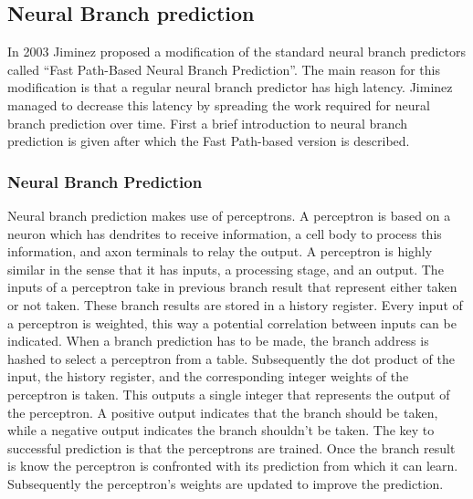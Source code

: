 \subsection{Neural Branch prediction}
\label{sec:neural}
In 2003 Jiminez \cite{neural} proposed a modification of the standard neural branch predictors called \enquote{Fast Path-Based Neural Branch Prediction}.
The main reason for this modification is that a regular neural branch predictor has high latency.
Jiminez managed to decrease this latency by spreading the work required for neural branch prediction over time.
First a brief introduction to neural branch prediction is given after which the Fast Path-based version is described.\\

\subsubsection{Neural Branch Prediction}
Neural branch prediction makes use of perceptrons.
A perceptron is based on a neuron which has dendrites to receive information, a cell body to process this information, and axon terminals to relay the output.
A perceptron is highly similar in the sense that it has inputs, a processing stage, and an output.
The inputs of a perceptron take in previous branch result that represent either taken or not taken.
These branch results are stored in a history register.
Every input of a perceptron is weighted, this way a potential correlation between inputs can be indicated.
 When a branch prediction has to be made, the branch address is hashed to select a perceptron from a table.
Subsequently the dot product of the input, the history register, and the corresponding integer weights of the perceptron is taken.
This outputs a single integer that represents the output of the perceptron.
A positive output indicates that the branch should be taken, while a negative output indicates the branch shouldn't be taken.
The key to successful prediction is that the perceptrons are trained.
Once the branch result is know the perceptron is confronted with its prediction from which it can learn.
Subsequently the perceptron's weights are updated to improve the prediction.

